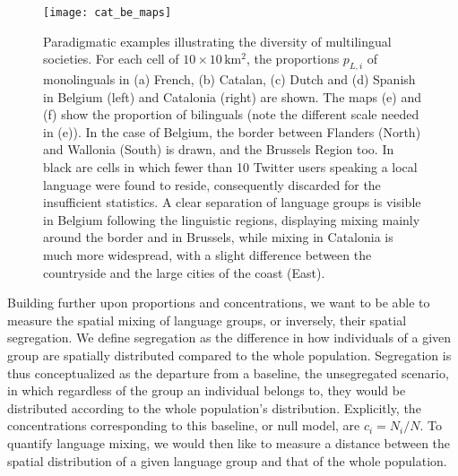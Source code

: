 \documentclass[../thesis.tex]{subfiles}
\begin{document}
\begin{figure*}[p!]
  \centering
  \texttt{[image: cat\_be\_maps]}
  \caption{Paradigmatic examples illustrating the diversity of multilingual societies.
  For each cell of $10 \times 10 \, \si{\kilo \meter \squared}$, the proportions
  $p_{L,i}$ of monolinguals in (a) French, (b) Catalan, (c) Dutch and (d) Spanish in
  Belgium (left) and Catalonia (right) are shown. The maps (e) and (f) show the
  proportion of bilinguals (note the different scale needed in (e)). In the case of
  Belgium, the border between Flanders (North) and Wallonia (South) is drawn, and the
  Brussels Region too. In black are cells in which fewer than 10 Twitter users speaking
  a local language were found to reside, consequently discarded for the insufficient
  statistics. A clear separation of language groups is visible in Belgium following the
  linguistic regions, displaying mixing mainly around the border and in Brussels, while
  mixing in Catalonia is much more widespread, with a slight difference between the
  countryside and the large cities of the coast (East).}
  \label{fig:cat_be_maps}
\end{figure*}

Building further upon proportions and concentrations, we want to be able to measure the
spatial mixing of language groups, or inversely, their spatial segregation. We define
segregation as the difference in how individuals of a given group are spatially
distributed compared to the whole population. Segregation is thus conceptualized as the
departure from a baseline, the unsegregated scenario, in which regardless of the group
an individual belongs to, they would be distributed according to the whole population's
distribution. Explicitly, the concentrations corresponding to this baseline, or null
model, are $c_i = N_i / N$. To quantify language mixing, we would then like to measure a
distance between the spatial distribution of a given language group and that of the
whole population.
\end{document}
